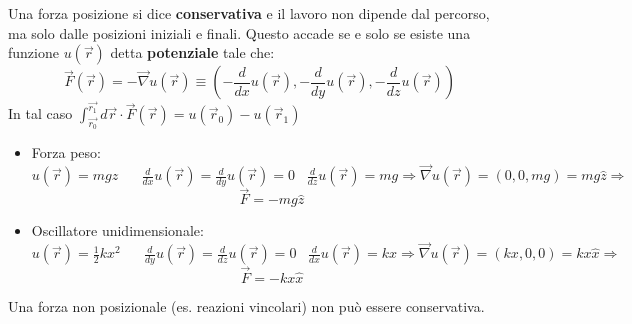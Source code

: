 \hspace{-15pt}Una forza posizione si dice \textbf{conservativa} e il lavoro non dipende dal percorso, ma solo dalle posizioni iniziali e finali.
Questo accade se e solo se esiste una funzione $u(\vec{r})$ detta \textbf{potenziale} tale che:
$$\vec{F}(\vec{r}) = -\vec{\nabla}u(\vec{r}) \equiv (-\frac{d}{dx}u(\vec{r}), -\frac{d}{dy}u(\vec{r}), -\frac{d}{dz}u(\vec{r}))$$
In tal caso $\int_{\vec{r_0}}^{\vec{r_1}} d\vec{r} \cdot \vec{F}(\vec{r}) = u(\vec{r}_0) - u(\vec{r}_1)$
\begin{itemize}
    \item Forza peso: $u(\vec{r}) = mgz \hspace{20pt} \frac{d}{dx}u(\vec{r}) = \frac{d}{dy}u(\vec{r}) = 0 \hspace{10pt} \frac{d}{dz}u(\vec{r}) = mg \Rightarrow \vec{\nabla}u(\vec{r}) = (0,0, mg)= mg\hat{z} \Rightarrow$
    $$ \vec{F}= -mg\hat{z}$$
    \item Oscillatore unidimensionale: $u(\vec{r}) = \frac{1}{2}kx^2 \hspace{20pt} \frac{d}{dy}u(\vec{r}) = \frac{d}{dz} u(\vec{r}) = 0 \hspace{10pt} \frac{d}{dx}u(\vec{r}) = kx \Rightarrow \vec{\nabla}u(\vec{r}) = (kx, 0, 0) = kx\hat{x} \Rightarrow$
    $$ \vec{F} = -kx\hat{x}$$
\end{itemize}
\begin{observation}
    Una forza non posizionale (es. reazioni vincolari) non può essere conservativa.
\end{observation}

